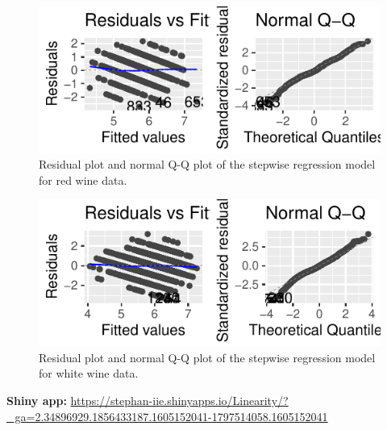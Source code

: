 \documentclass[letterpaper,11pt,twocolumn,twoside,]{pinp}
\begin{document}
\begin{figure}[H]

{\centering \includegraphics{DATA2X02_group_files/figure-latex/red_resid-1} 

}

\caption{Residual plot and normal Q-Q plot of the stepwise regression model for red wine data.}\label{fig:red_resid}
\end{figure}

\begin{figure}[H]

{\centering \includegraphics{DATA2X02_group_files/figure-latex/white_resid-1} 

}

\caption{Residual plot and normal Q-Q plot of the stepwise regression model for white wine data.}\label{fig:white_resid}
\end{figure}

\textbf{Shiny app:}
\url{https://stephan-iie.shinyapps.io/Linearity/?_ga=2.34896929.1856433187.1605152041-1797514058.1605152041}





\end{document}
